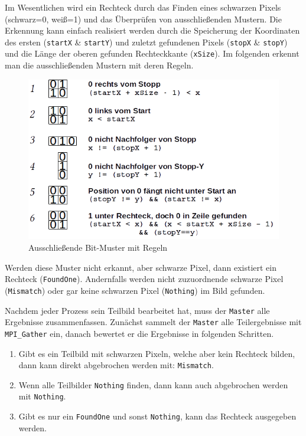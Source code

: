 Im Wesentlichen wird ein Rechteck durch das Finden eines schwarzen Pixels \linebreak(schwarz=0, weiß=1) und das Überprüfen von ausschließenden Mustern. Die Erkennung kann einfach realisiert werden durch die Speicherung der Koordinaten des ersten (\texttt{startX} \& \texttt{startY}) und zuletzt gefundenen Pixels (\texttt{stopX} \& \texttt{stopY}) und die Länge der oberen gefunden Rechteckkante (\texttt{xSize}). Im folgenden erkennt man die ausschließenden Mustern mit deren Regeln.
\begin{figure}[h]
    \centering
    \includegraphics[scale=0.75]{mismatches.png}
    \caption{Ausschließende Bit-Muster mit Regeln}
    \label{fig:mismatches}
\end{figure}

Werden diese Muster nicht erkannt, aber schwarze Pixel, dann existiert ein Rechteck (\texttt{FoundOne}). Andernfalls werden nicht zuzuordnende schwarze Pixel (\texttt{Mismatch}) oder gar keine schwarzen Pixel (\texttt{Nothing}) im Bild gefunden.

Nachdem jeder Prozess sein Teilbild bearbeitet hat, muss der \texttt{Master} alle Ergebnisse zusammenfassen. Zunächst sammelt der \texttt{Master} alle Teilergebnisse mit \texttt{MPI\_Gather} ein, danach bewertet er die Ergebnisse in folgenden Schritten.

\begin{enumerate}
	\item Gibt es ein Teilbild mit schwarzen Pixeln, welche aber kein Rechteck bilden, dann kann direkt abgebrochen werden mit: \texttt{Mismatch}.
	\item Wenn alle Teilbilder \texttt{Nothing} finden, dann kann auch abgebrochen werden mit \texttt{Nothing}.
	\item Gibt es nur ein \texttt{FoundOne} und sonst \texttt{Nothing}, kann das Rechteck ausgegeben werden.
\end{enumerate}

